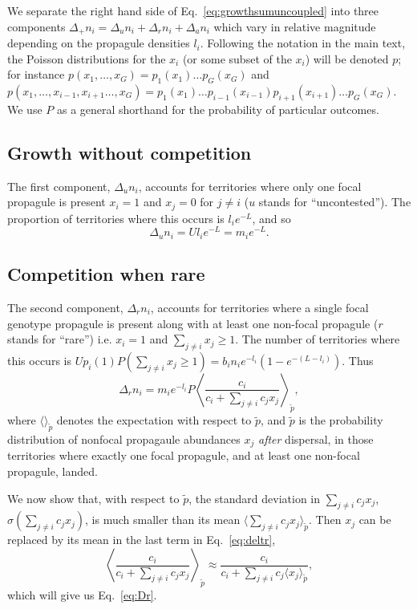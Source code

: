 \documentclass[11pt]{article}
\begin{document}
We separate the right hand side of Eq.~\eqref{eq:growthsumuncoupled} into three components $\Delta_+ n_i = \Delta_u n_i+\Delta_r n_i+\Delta_a n_i$ which vary in relative magnitude depending on the propagule densities $l_i$. Following the notation in the main text, the Poisson distributions for the $x_i$ (or some subset of the $x_i$) will be denoted $p$; for instance $p(x_1,\ldots,x_G)=p_1(x_1)\ldots p_G(x_G)$ and $p(x_1,\ldots,x_{i-1},x_{i+1}\ldots,x_G)=p_1(x_1)\ldots p_{i-1}(x_{i-1})p_{i+1}(x_{i+1})\ldots p_G(x_G)$. We use $P$ as a general shorthand for the probability of particular outcomes.

\subsection*{Growth without competition}

The first component, $\Delta_u n_i$, accounts for territories where only one focal propagule is present $x_i=1$ and $x_j=0$ for $j\neq i$ ($u$ stands for ``uncontested''). The proportion of territories where this occurs is $l_i e^{-L}$, and so 
\begin{equation}
\Delta_u n_i=Ul_i e^{-L}=m_i e^{-L}.
\end{equation}

\subsection*{Competition when rare}

The second component, $\Delta_r n_i$, accounts for territories where a single focal genotype propagule is present along with at least one non-focal propagule ($r$ stands for ``rare'') i.e. $x_i=1$ and $\sum_{j\neq i} x_j\geq 1$. The number of territories where this occurs is $Up_i(1)P(\sum_{j\neq i} x_j\geq 1)=b_i n_i e^{-l_i}(1-e^{-(L-l_i)})$. Thus 
\begin{equation}
\Delta_r n_i = m_i e^{-l_i}P\left\langle  \frac{c_i}{c_i +\sum_{j\neq i} c_j x_j } \right\rangle_{\tilde{p}},  \label{eq:deltr}
\end{equation}
where $\langle \rangle_{\tilde{p}}$ denotes the expectation with respect to $\tilde{p}$, and $\tilde{p}$ is the probability distribution of nonfocal propagaule abundances $x_j$ \textit{after} dispersal, in those territories where exactly one focal propagule, and at least one non-focal propagule, landed. 

We now show that, with respect to $\tilde{p}$, the standard deviation in $\sum_{j\neq i} c_j x_j$, $\sigma(\sum_{j\neq i} c_j x_j)$, is much smaller than its mean $\langle\sum_{j\neq i} c_j x_j\rangle_{\tilde{p}}$. Then $x_j$ can be replaced by its mean in the last term in Eq.~\eqref{eq:deltr},
\begin{equation}
\left\langle\frac{c_i}{c_i +\sum_{j\neq i} c_j x_j}\right\rangle_{\tilde{p}}\approx \frac{c_i}{c_i +\sum_{j\neq i} c_j \langle x_j\rangle_{\tilde{p}}},\label{eq:meanfieldr}
\end{equation}
which will give us Eq.~\eqref{eq:Dr}.
\end{document}
